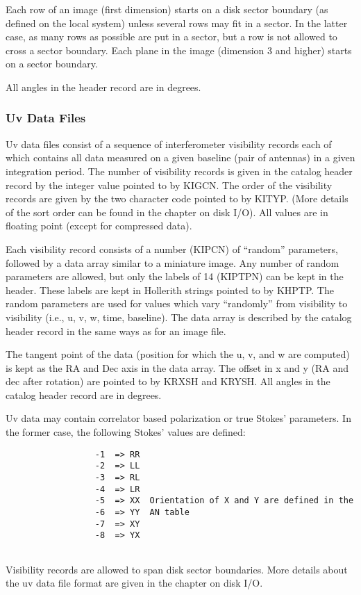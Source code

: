 Each row of an image (first dimension) starts on a disk sector
boundary (as defined on the local system) unless several rows may fit
in a sector.  In the latter case, as many rows as possible are put in
a sector, but a row is not allowed to cross a sector boundary.  Each
plane in the image (dimension 3 and higher) starts on a sector
boundary.

All angles in the header record are in degrees.

\subsubsection{Uv Data Files }
Uv data files consist of a sequence of interferometer visibility
records each of which contains all data measured on a given baseline
(pair of antennas) in a given integration period.  The number of
visibility records is given in the catalog header record by the
integer value pointed to by KIGCN.  The order of the visibility
records are given by the two character code pointed to by KITYP. (More
details of the sort order can be found in the chapter on disk I/O).
All values are in floating point (except for compressed data).

Each visibility record consists of a number (KIPCN) of ``random''
parameters, followed by a data array similar to a miniature image. Any
number of random parameters are allowed, but only the labels of 14
(KIPTPN) can be kept in the header.  These labels are kept in
Hollerith strings pointed to by KHPTP.  The random parameters are used
for values which vary ``randomly'' from visibility to visibility
(i.e., u, v, w, time, baseline).  The data array is described by the
catalog header record in the same ways as for an image file.

The tangent point of the data (position for which the u, v, and w are
computed) is kept as the RA and Dec axis in the data array. The offset
in x and y (RA and dec after rotation) are pointed to by KRXSH and
KRYSH.  All angles in the catalog header record are in degrees.

Uv data may contain correlator based polarization or true Stokes'
parameters.  In the former case, the following Stokes' values are
defined:

\begin{verbatim}
                  -1  => RR
                  -2  => LL
                  -3  => RL
                  -4  => LR
                  -5  => XX  Orientation of X and Y are defined in the
                  -6  => YY  AN table
                  -7  => XY
                  -8  => YX


\end{verbatim}
Visibility records are allowed to span disk sector boundaries. More
details about the uv data file format are given in the chapter on disk
I/O.


